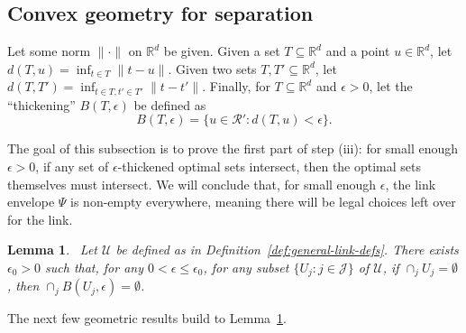 \documentclass[11pt]{article}
\newcommand{\reals}{\mathbb{R}}
\newcommand{\R}{\mathcal{R}}
\newcommand{\U}{\mathcal{U}}
\newtheorem{lemma}{Lemma}
\begin{document}
\subsection{Convex geometry for separation}

Let some norm $\|\cdot\|$ on $\reals^d$ be given.
Given a set $T\subseteq\reals^d$ and a point $u\in\reals^d$, let $d(T,u) = \inf_{t \in T} \|t-u\|$.
Given two sets $T,T'\subseteq\reals^d$, let $d(T,T') = \inf_{t\in T, t' \in T'} \|t-t'\|$.
Finally, for $T\subseteq \reals^d$ and $\epsilon > 0$, let the ``thickening'' $B(T,\epsilon)$ be defined as
\[ B(T,\epsilon) = \{u \in \R' : d(T,u) < \epsilon \} . \]


The goal of this subsection is to prove the first part of step (iii): for small enough $\epsilon>0$, if any set of $\epsilon$-thickened optimal sets intersect, then the optimal sets themselves must intersect.
We will conclude that, for small enough $\epsilon$, the link envelope $\Psi$ is non-empty everywhere, meaning there will be legal choices left over for the link.
\begin{lemma}~\label{lem:thick-intersect}
  Let $\U$ be defined as in Definition~\ref{def:general-link-defs}.
  There exists $\epsilon_0 > 0$ such that, for any $0 < \epsilon \leq \epsilon_0$, for any subset $\{U_j : j \in \mathcal{J}\}$ of $\U$, if $\cap_j U_j = \emptyset$, then $\cap_j B(U_j,\epsilon) = \emptyset$.
\end{lemma}

The next few geometric results build to Lemma~\ref{lem:thick-intersect}.
\end{document}
